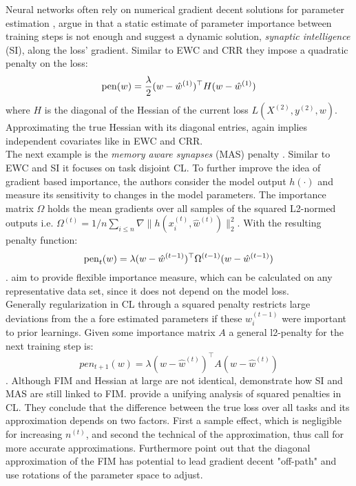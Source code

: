 Neural networks often rely on numerical gradient decent solutions for parameter estimation \cite{Fahrmeir_2022}, \citeauthor{zenke2017continuallearningsynapticintelligence} argue in \cite{zenke2017continuallearningsynapticintelligence} that a static estimate of parameter importance between training steps is not enough and suggest a dynamic solution, \textit{synaptic intelligence} (SI), along the loss' gradient. Similar to EWC and CRR they impose a quadratic penalty on the loss:
\begin{equation}\label{SI}
	\operatorname{pen}(w) = \frac{\lambda}{2} (w - \hat{w}^{(1)})^\top H (w - \hat{w}^{(1)})
\end{equation} where $H$ is the diagonal of the Hessian of the current loss $L(X^{(2)}, y^{(2)}, w)$. Approximating the true Hessian with its diagonal entries, again implies independent covariates like in EWC and CRR.\\
The next example is the \textit{memory aware synapses} (MAS) penalty \cite{aljundi2018memoryawaresynapseslearning}. Similar to EWC and SI it focuses on task disjoint CL. To further improve the idea of gradient based importance, the authors consider the model output $h(\cdot)$ and measure its sensitivity to changes in the model parameters. The importance matrix $\Omega$ holds the mean gradients over all samples of the squared L2-normed outputs i.e. $\Omega^{(t)} = 1/n \sum_{i \leq n} \nabla \lVert h(x^{(t)}_i, \hat{w}^{(t)}) \rVert_2^2$. With the resulting penalty function:
\begin{equation}\label{MAS}
	\operatorname{pen}_t(w)=\lambda (w - \hat{w}^{(t-1)})^\top \Omega^{(t-1)} (w - \hat{w}^{(t-1)})
\end{equation}.
\cite{aljundi2018memoryawaresynapseslearning} aim to provide flexible importance measure, which can be calculated on any representative data set, since it does not depend on the model loss.\\

Generally regularization in CL through a squared penalty restricts large deviations from the a fore estimated parameters if these $w_i^{(t-1)}$ were important to prior learnings. Given some importance matrix $A$ a general l2-penalty for the next training step is:
\begin{equation}\label{l2pen}
	pen_{t+1}(w) = \lambda (w - \hat{w}^{(t)})^\top A (w - \hat{w}^{(t)})
\end{equation}.
Although FIM and Hessian at large are not identical, \cite{benzing2021unifyingregularisationmethodscontinual} demonstrate how SI and MAS are still linked to FIM. \cite{yin2021optimizationgeneralizationregularizationbasedcontinual} provide a unifying analysis of squared penalties in CL. They conclude that the difference between the true loss over all tasks and its approximation depends on two factors. First a sample effect, which is negligible for increasing $n^{(t)}$, and second the technical of the approximation, thus call for more accurate approximations. Furthermore \cite{liu2018rotatenetworksbetterweight} point out that the diagonal approximation of the FIM has potential to lead gradient decent "off-path" and use rotations of the parameter space to adjust.